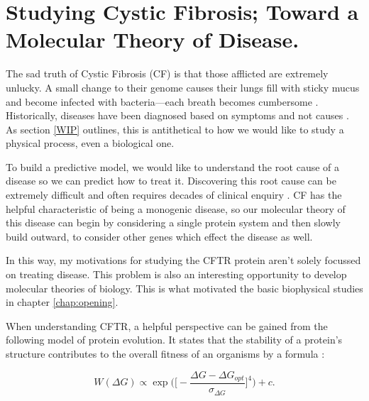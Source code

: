 
\section{Studying Cystic Fibrosis; Toward a Molecular Theory of Disease.} 

The sad truth of Cystic Fibrosis (CF) is that those afflicted are extremely unlucky. A small change to their genome causes their lungs fill with sticky mucus and become infected with bacteria---each breath becomes cumbersome \cite{katkin2022}. Historically, diseases have been diagnosed based on symptoms and not causes \cite{foucault1994}. As section \ref{WIP} outlines, this is antithetical to how we would like to study a physical process, even a biological one. 

To build a predictive model, we would like to understand the root cause of a disease so we can predict how to treat it. Discovering this root cause can be extremely difficult and often requires decades of clinical enquiry \cite{dubois2016, tsui2013}. CF has the helpful characteristic of being a monogenic disease, so our molecular theory of this disease can begin by considering a single protein system and then slowly build outward, to  consider other genes which effect the disease as well.

In this way, my motivations for studying the CFTR protein aren't solely focussed on treating disease. This problem is also an interesting opportunity to develop molecular theories of biology. This is what motivated the basic biophysical studies in chapter \ref{chap:opening}. 

When understanding CFTR, a helpful perspective can be gained from the following model of protein evolution. It states that the stability of a protein's structure contributes to the overall fitness of an organisms by a formula \cite{depristo2005}:

\begin{equation}
	\label{fitness_equation}
	W(\Delta G) \propto \exp\bigg(\bigg[-\frac{\Delta G - \Delta G_{opt}}{\sigma_{\Delta G}}\bigg]^4\bigg) + c.
\end{equation}

